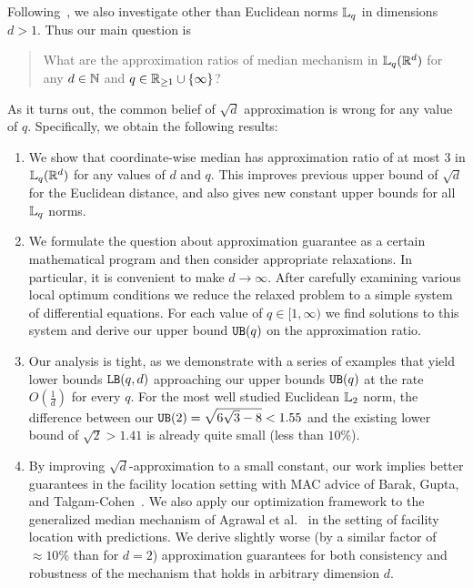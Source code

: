 Following~\cite{FeigenbaumSY17}, we also investigate other than Euclidean norms $\lqnorm$ in dimensions $d>1$. Thus our main question is
\begin{quote}
What are the approximation ratios of median mechanism in $\lqnorm(\reals^d)$ for any $d\in\nats$ and $q\in\reals_{\ge 1}\cup\{\infty\}$?  
\end{quote}
As it turns out, the common belief of $\sqrt{d}$ approximation is wrong for any value of $q$. Specifically, we obtain the following results:    
\begin{enumerate}
        \item We show that coordinate-wise median has approximation ratio of at most $3$ in $\lqnorm(\reals^d)$ for any values of $d$ and $q$. This improves 
        previous upper bound of $\sqrt{d}$ for the Euclidean distance, and also gives new constant upper bounds for all $\lqnorm$ norms.  
        \item We formulate the question about approximation guarantee as a certain mathematical program and then consider appropriate relaxations. In particular, it is 
        convenient to make $d\to\infty$. After carefully examining various local optimum conditions we reduce the relaxed problem to a simple system of differential equations. 
        For each value of $q\in[1,\infty)$ we find solutions to this system and derive our upper bound $\UB(q)$ on the approximation ratio. 
        \item Our analysis is tight, as we demonstrate with a series of examples that yield lower bounds $\LB(q,d)$ approaching our upper bounds $\UB(q)$ at the rate 
        $O(\frac{1}{d})$ for every $q$. For the most well studied Euclidean $\lqnorm[2]$ norm, the difference between our $\UB(2)=\sqrt{6\sqrt{3}-8}<1.55$ and the existing 
        lower bound of 
        $\sqrt{2}>1.41$ is already quite small (less than $10\%$).
        \item By improving $\sqrt{d}$-approximation to a small constant, our work implies better guarantees in the facility location setting with MAC advice of Barak, Gupta, and Talgam-Cohen~\cite{barak2024mac}. We also apply our optimization framework to the generalized median mechanism of Agrawal et al.~\cite{AgrawalBGTX22} in 
        the setting of facility location with predictions. We derive slightly worse (by a similar factor of $\approx 10\%$ than for $d=2$) approximation guarantees for both consistency and robustness of the mechanism that holds in arbitrary dimension $d$.
    \end{enumerate}


